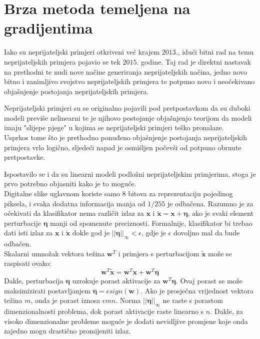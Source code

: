 \documentclass[utf8, diplomski]{fer}
\begin{document}
\section{Brza metoda temeljena na gradijentima}\label{fgm}
Iako su neprijateljski primjeri otkriveni već krajem $2013.$, idući bitni rad na temu neprijateljskih primjera pojavio se tek $2015.$ godine\citep{Goodfellow2015ExplainingAH}. Taj rad je direktni nastavak na prethodni te nudi nove načine generiranja neprijateljskih načina, jedno novo bitno i zanimljivo svojstvo neprijateljskih primjera te potpuno novo i neočekivano objašnjenje postojanja neprijateljskih primjera.
\par
Neprijateljski primjeri su se originalno pojavili pod pretpostavkom da su duboki modeli previše nelinearni te je njihovo postojanje objašnjenjo teorijom da modeli imaju "slijepe pjege" u kojima se neprijateljski primjeri teško pronalaze. \\
Usprkos tome što je prethodno ponuđeno objašnjenje postojanja neprijateljskih primjera vrlo logično, sljedeći napad je osmišljen počevši od potpuno obrnute pretpostavke.
\par
Ispostavilo se i da su linearni modeli podložni neprijateljskim primjerima, stoga je prvo potrebno objasniti kako je to moguće. \\
Digitalne slike uglavnom koriste samo 8 bitova za reprezentaciju pojedinog piksela, i svaka dodatna informacija manja od $1/255$ je odbačena. Razumno je za očekivati da klasifikator nema različit izlaz za $\boldsymbol{x}$ i $\boldsymbol{\tilde{x}} = \boldsymbol{x} + \boldsymbol{\eta}$, ako je svaki element perturbacije $\boldsymbol{\eta}$ manji od spomenute preciznosti. Formalnije, klasifikator bi trebao dati isti izlaz za $\boldsymbol{x}$ i $\boldsymbol{\tilde{x}}$ dokle god je $||\boldsymbol{\eta}||_{\infty} < \epsilon$, gdje je $\epsilon$ dovoljno mal da bude odbačen. \\
Skalarni umnožak vektora težina $\boldsymbol{w}^{T}$ i primjera s perturbacijom $\boldsymbol{\tilde{x}}$ može se raspisati ovako:
\begin{equation}
	\boldsymbol{w}^{T}\boldsymbol{\tilde{x}} = \boldsymbol{w}^{T}\boldsymbol{x} + \boldsymbol{w}^{T}\boldsymbol{\eta}
\end{equation}
Dakle, perturbacija $\boldsymbol{\eta}$ uzrokuje porast aktivacije za $\boldsymbol{w}^{T}\boldsymbol{\eta}$. Ovaj porast se može maksimizirati postavljanjem $\boldsymbol{\eta} = \epsilon sign(\boldsymbol{w})$. Ako je prosječna vrijednost vektora težina $m$, onda je porast iznosa $\epsilon mn$. Norma $||\boldsymbol{\eta}||_{\infty}$ ne raste s porastom dimenzionalnosti problema, dok porast aktivacije raste linearno s $n$. Dakle, za visoko dimenzionalne probleme moguće je dodati nevidljive promjene koje onda zajedno mogu drastično promijeniti izlaz.
\end{document}
